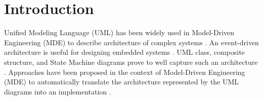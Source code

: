\section{Introduction}
\label{sec:intro}





Unified Modeling Language (UML) has been widely used in Model-Driven Engineering (MDE) to describe architecture of complex systems \cite{HUTCHINSON2014144}.
An event-driven architecture is useful for designing 
embedded systems \cite{Dunkels:2006:PSE:1182807.1182811}.
UML class, composite structure, and State Machine diagrams prove to well capture such an architecture \cite{possepapyrusrt}.    
Approaches have been proposed in the context of Model-Driven Engineering (MDE) to automatically translate the architecture represented by the UML diagrams into an implementation \cite{possepapyrusrt}.

